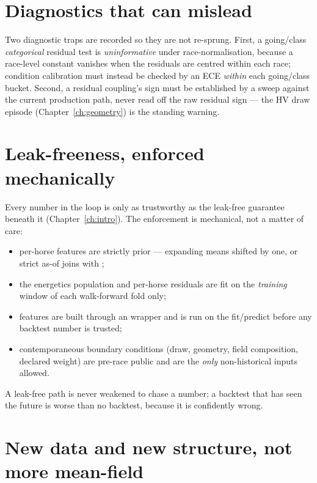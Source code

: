 \section{Diagnostics that can mislead}

Two diagnostic traps are recorded so they are not re-sprung. First, a going/class \emph{categorical}
residual test is \emph{uninformative} under race-normalisation, because a race-level constant
vanishes when the residuals are centred within each race; condition calibration must instead be
checked by an ECE \emph{within} each going/class bucket. Second, a residual coupling's sign must be
established by a sweep against the current production path, never read off the raw residual sign ---
the HV draw episode (Chapter~\ref{ch:geometry}) is the standing warning.

\section{Leak-freeness, enforced mechanically}

Every number in the loop is only as trustworthy as the leak-free guarantee beneath it
(Chapter~\ref{ch:intro}). The enforcement is mechanical, not a matter of care:
\begin{itemize}
  \item per-horse features are strictly prior --- expanding means shifted by one, or strict as-of
        joins with ;
  \item the energetics population and per-horse residuals are fit on the \emph{training} window of
        each walk-forward fold only;
  \item features are built through an  wrapper and  is
        run on the fit/predict before any backtest number is trusted;
  \item contemporaneous boundary conditions (draw, geometry, field composition, declared weight)
        are pre-race public and are the \emph{only} non-historical inputs allowed.
\end{itemize}
A leak-free path is never weakened to chase a number; a backtest that has seen the future is worse
than no backtest, because it is confidently wrong.

\section{New data and new structure, not more mean-field}

